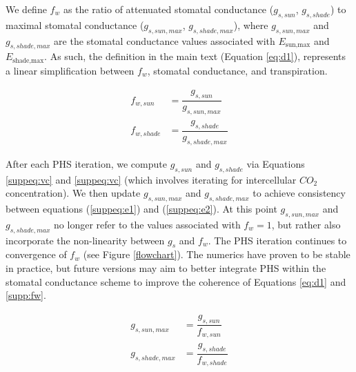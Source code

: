 \documentclass[draft,linenumbers]{agujournal}
\begin{document}
We define $f_w$ as the ratio of attenuated stomatal conductance ($g_{s,sun}$, $g_{s,shade}$) to maximal stomatal conductance ($g_{s,sun,max}$, $g_{s,shade,max}$),
where $g_{s,sun,max}$ and $g_{s,shade,max}$ are the stomatal conductance values associated with $E_{\text{sun,max}}$ and $E_{\text{shade,max}}$.
As such, the definition in the main text (Equation \ref{eq:d1}), represents a linear simplification between $f_w$, stomatal conductance, and transpiration.

    \begin{equation}
    \begin{aligned}
    \label{supp:fw}
    f_{w,sun} &= \dfrac{g_{s,sun}}{g_{s,sun,max}}    \\
    f_{w,shade} &= \dfrac{g_{s,shade}}{g_{s,shade,max}}
    \end{aligned}
    \end{equation}

After each PHS iteration, we compute $g_{s,sun}$ and $g_{s,shade}$ via Equations \ref{suppeq:vc} and \ref{suppeq:vc} (which involves iterating for intercellular $CO_2$ concentration).
We then update $g_{s,sun,max}$ and $g_{s,shade,max}$ to achieve consistency between equations (\ref{suppeq:e1}) and (\ref{suppeq:e2}).
At this point $g_{s,sun,max}$ and $g_{s,shade,max}$ no longer refer to the values associated with $f_w=1$, but rather also incorporate the non-linearity between $g_s$ and $f_w$.
The PHS iteration continues to convergence of $f_w$ (see Figure \ref{flowchart}).
The numerics have proven to be stable in practice, but future versions may aim to better integrate PHS within the stomatal conductance scheme to improve the coherence of Equations \ref{eq:d1} and \ref{supp:fw}.

    \begin{equation}
    \begin{aligned}
    g_{s,sun,max} &= \dfrac{g_{s,sun}}{f_{w,sun}} \\
    g_{s,shade,max} &= \dfrac{g_{s,shade}}{f_{w,shade}} \\
    \end{aligned}
    \end{equation}
    
\end{document}
